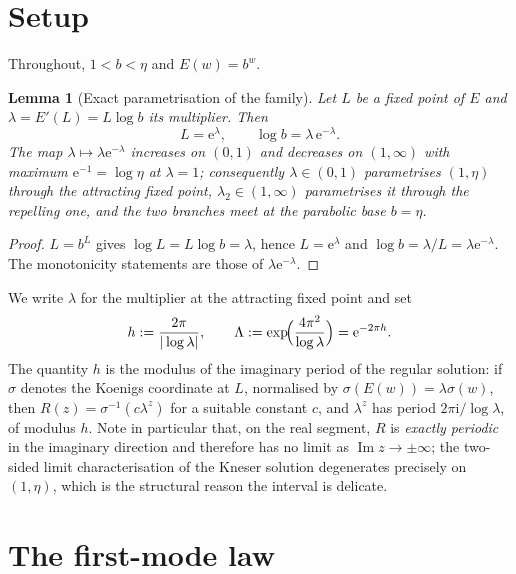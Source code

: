 \documentclass[11pt,a4paper]{article}
\newtheorem{lemma}[theorem]{Lemma}
\theoremstyle{definition}
\newcommand{\Rr}{R}
\newcommand{\eee}{\mathrm{e}}
\newcommand{\ii}{\mathrm{i}}
\begin{document}
\section{Setup}\label{sec:setup}

Throughout, $1<b<\eta$ and $E(w)=b^{w}$.

\begin{lemma}[Exact parametrisation of the family]\label{lem:param}
Let $L$ be a fixed point of $E$ and $\lambda=E'(L)=L\log b$ its multiplier.
Then
\begin{equation}\label{eq:param}
  L=\eee^{\lambda},\qquad \log b=\lambda\,\eee^{-\lambda}.
\end{equation}
The map $\lambda\mapsto \lambda\eee^{-\lambda}$ increases on $(0,1)$ and
decreases on $(1,\infty)$ with maximum $\eee^{-1}=\log\eta$ at $\lambda=1$;
consequently $\lambda\in(0,1)$ parametrises $(1,\eta)$ through the attracting
fixed point, $\lambda_2\in(1,\infty)$ parametrises it through the repelling one,
and the two branches meet at the parabolic base $b=\eta$.
\end{lemma}

\begin{proof}
$L=b^{L}$ gives $\log L=L\log b=\lambda$, hence $L=\eee^{\lambda}$ and
$\log b=\lambda/L=\lambda\eee^{-\lambda}$.  The monotonicity statements are
those of $\lambda\eee^{-\lambda}$.
\end{proof}

We write $\lambda$ for the multiplier at the attracting fixed point and set
\begin{equation}\label{eq:Lambda}
  h:=\frac{2\pi}{|\log\lambda|},\qquad
  \Lambda:=\exp\!\Bigl(\frac{4\pi^{2}}{\log\lambda}\Bigr)=\eee^{-2\pi h}.
\end{equation}
The quantity $h$ is the modulus of the imaginary period of the regular
solution: if $\sigma$ denotes the Koenigs coordinate at $L$, normalised by
$\sigma(E(w))=\lambda\sigma(w)$, then $\Rr(z)=\sigma^{-1}(c\lambda^{z})$ for a
suitable constant $c$, and $\lambda^{z}$ has period $2\pi\ii/\log\lambda$, of
modulus $h$.  Note in particular that, on the real segment, $\Rr$ is
\emph{exactly periodic} in the imaginary direction and therefore has no limit as
$\operatorname{Im}z\to\pm\infty$; the two-sided limit characterisation of the
Kneser solution degenerates precisely on $(1,\eta)$, which is the structural
reason the interval is delicate.

\section{The first-mode law}\label{sec:firstmode}
\end{document}
